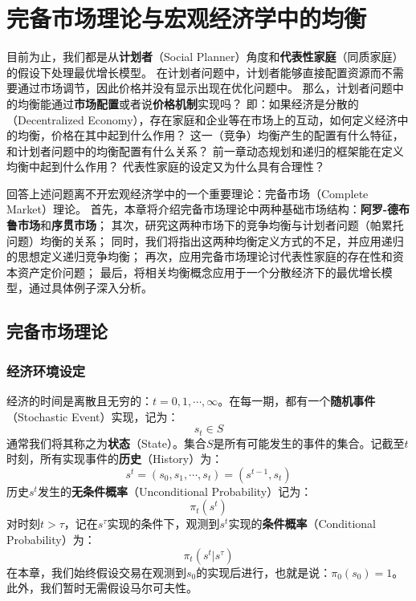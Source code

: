 

\chapter{完备市场理论与宏观经济学中的均衡}

目前为止，我们都是从\textbf{计划者}（Social Planner）角度和\textbf{代表性家庭}（同质家庭）的假设下处理最优增长模型。
在计划者问题中，计划者能够直接配置资源而不需要通过市场调节，因此价格并没有显示出现在优化问题中。
那么，计划者问题中的均衡能通过\textbf{市场配置}或者说\textbf{价格机制}实现吗？
即：如果经济是分散的（Decentralized Economy），存在家庭和企业等在市场上的互动，如何定义经济中的均衡，价格在其中起到什么作用？
这一（竞争）均衡产生的配置有什么特征，和计划者问题中的均衡配置有什么关系？
前一章动态规划和递归的框架能在定义均衡中起到什么作用？
代表性家庭的设定又为什么具有合理性？

回答上述问题离不开宏观经济学中的一个重要理论：完备市场（Complete Market）理论。
首先，本章将介绍完备市场理论中两种基础市场结构：\textbf{阿罗-德布鲁市场}和\textbf{序贯市场}；
其次，研究这两种市场下的竞争均衡与计划者问题（帕累托问题）均衡的关系；
同时，我们将指出这两种均衡定义方式的不足，并应用递归的思想定义递归竞争均衡；
再次，应用完备市场理论讨代表性家庭的存在性和资本资产定价问题；
最后，将相关均衡概念应用于一个分散经济下的最优增长模型，通过具体例子深入分析。


\section{完备市场理论}


\subsection{经济环境设定}

经济的时间是离散且无穷的：$t=0,1,\cdots, \infty$。在每一期，都有一个\textbf{随机事件}（Stochastic Event）实现，记为：
$$s_t\in S$$
通常我们将其称之为\textbf{状态}（State）。集合$S$是所有可能发生的事件的集合。记截至$t$时刻，所有实现事件的\textbf{历史}（History）为：
$$s^t = \left(s_0,s_1,\cdots,s_t\right) = \left(s^{t-1},s_t\right)$$
历史$s^t$发生的\textbf{无条件概率}（Unconditional Probability）记为：
$$\pi_t\left(s^t\right)$$
对时刻$t>\tau$，记在$s^{\tau}$实现的条件下，观测到$s^t$实现的\textbf{条件概率}（Conditional Probability）为：
$$\pi_t\left(s^t|s^{\tau}\right)$$
在本章，我们始终假设交易在观测到$s_0$的实现后进行，也就是说：$\pi_0\left(s_0\right)=1$。此外，我们暂时无需假设马尔可夫性。

